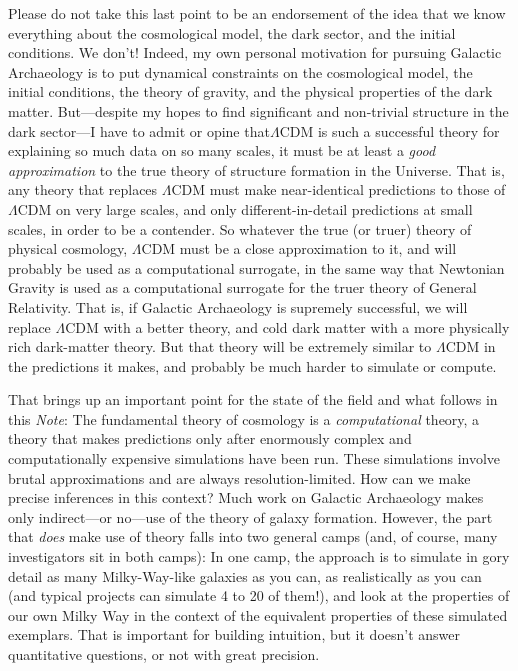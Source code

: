\documentclass[11pt, letterpaper]{article}
\newcommand{\documentname}{\textsl{Note}}
\begin{document}
Please do not take this last point to be an endorsement of the idea
that we know everything about the cosmological model, the dark sector,
and the initial conditions. We don't! Indeed, my own personal
motivation for pursuing Galactic Archaeology is to put dynamical
constraints on the cosmological model, the initial conditions,
the theory of gravity, and the
physical properties of the dark matter. But---despite my hopes to find
significant and non-trivial structure in the dark sector---I have
to admit or opine that$\Lambda$CDM is such a
successful theory for explaining so much data on so many scales, it
must be at least a \emph{good approximation} to the true theory of
structure formation in the Universe. That is, any theory that replaces
$\Lambda$CDM must make near-identical predictions to those of $\Lambda$CDM
on very large
scales, and only different-in-detail predictions at small scales, in
order to be a contender. So whatever the true (or truer) theory of
physical cosmology, $\Lambda$CDM must be a close approximation to it,
and will probably be used as a computational surrogate, in the same
way that Newtonian Gravity is used as a computational surrogate for
the truer theory of General Relativity. That is, if Galactic
Archaeology is supremely successful, we will replace $\Lambda$CDM with
a better theory, and cold dark matter with a more physically rich
dark-matter theory. But that theory will be extremely similar to
$\Lambda$CDM in the predictions it makes, and probably be much harder to
simulate or compute.

That brings up an important point for the state of the field and what
follows in this \documentname: The fundamental theory of cosmology is
a \emph{computational} theory, a theory that makes predictions only
after enormously complex and computationally expensive simulations
have been run. These simulations involve brutal approximations and are
always resolution-limited. How can we make precise inferences in this
context?  Much work on Galactic Archaeology makes only indirect---or
no---use of the theory of galaxy formation. However, the part that
\emph{does} make use of theory falls into two general camps (and, of
course, many investigators sit in both camps): In one camp, the
approach is to simulate in gory detail as many Milky-Way-like galaxies
as you can, as realistically as you can (and typical projects can
simulate 4 to 20 of them!), and look at the properties of our own
Milky Way in the context of the equivalent properties of these
simulated exemplars. That is important for building intuition, but
it doesn't answer quantitative questions, or not with great precision.
\end{document}
